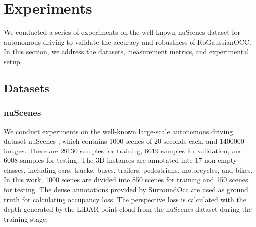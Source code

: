\documentclass[journal]{IEEEtran}
\begin{document}
\section{Experiments}
\label{sec:experiments}
We conducted a series of experiments on the well-known nuScenes dataset for autonomous driving to validate the accuracy and robustness of RoGaussianOCC.
In this section, we address the datasets, measurement metrics, and experimental setup. 

\subsection{Datasets} 
\subsubsection{nuScenes}

We conduct experiments on the well-known large-scale autonomous driving dataset nuScenes \cite{caesar2020nuscenes}, which contains 1000 scenes of 20 seconds each, and 1400000 images.
There are 28130 samples for training, 6019 samples for validation, and 6008 samples for testing.
The 3D instances are annotated into 17 non-empty classes, including cars, trucks, buses, trailers, pedestrians, motorcycles, and bikes.
In this work, 1000 scenes are divided into 850 scenes for training and 150 scenes for testing. 
The dense annotations provided by SurroundOcc \cite{wei2023surroundocc} are used as ground truth for calculating occupancy loss.
The perspective loss is calculated with the depth generated by the LiDAR point cloud from the nuScenes dataset during the training stage.
 
\end{document}
